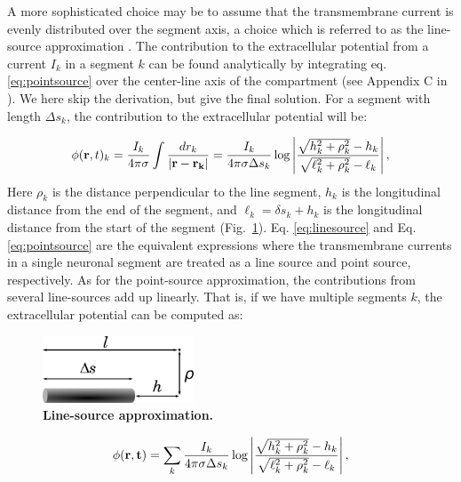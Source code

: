 A more sophisticated choice may be to assume that the transmembrane current is evenly distributed over the segment axis, a choice which is referred to as the line-source approximation \citep{Holt1999, Linden2014}. The contribution to the extracellular potential from a current $I_k$ in a segment $k$ can be found analytically by integrating eq. \ref{eq:pointsource} over the center-line axis of the compartment (see Appendix C in \citep{holt1998}). We here skip the derivation, but give the final solution. For a segment with length $\Delta s_k$, the contribution to the extracellular potential will be:

\begin{equation}
\phi({\bf r},t)_k = \frac{I_k}{4\pi \sigma} \int \frac{dr_k}{|{\bf r-r_k}|} = 
\frac{I_k}{4\pi \sigma \Delta s_k} \log \left| \frac{\sqrt{h_k^2+\rho_k^2}-h_k}{\sqrt{\ell_k^2+\rho_k^2}-\ell_k} \right|,
\label{eq:linesource}
\end{equation}
Here $\rho_k$ is the distance perpendicular to the line segment, $h_k$ is the longitudinal distance from the end of the segment, and $\ell_k = \delta s_k + h_k$ is the longitudinal distance from the start of the segment (Fig.~\ref{VC:fig:line_source_illustration}). Eq. \ref{eq:linesource} and Eq. \ref{eq:pointsource} are the equivalent expressions where the transmembrane currents in a single neuronal segment are treated as a line source and point source, respectively. As for the point-source approximation, the contributions from several line-sources add up linearly. That is, if we have multiple segments $k$, the extracellular potential can be computed as:
\begin{figure}[!ht]
\begin{center}
\includegraphics[width=0.4\textwidth]{Figures/VC/line_source_illustration.png}
\end{center}
\caption{\textbf{Line-source approximation.} 
\cite{Holt1998} 
}
\label{VC:fig:line_source_illustration}
\end{figure}

\begin{equation}
\phi({\bf r},{\bf t}) = \sum_k \frac{I_k}{4\pi \sigma \Delta s_k} \log \left| \frac{\sqrt{h_k^2+\rho_k^2}-h_k}{\sqrt{\ell_k^2+\rho_k^2}-\ell_k} \right|,
\label{eq:linesources}
\end{equation}

